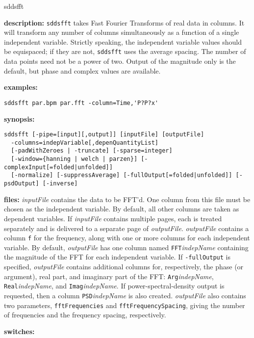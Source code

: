 \begin{sddsprog}{sddsfft}
  \item \textbf{description:} \verb|sddsfft| takes Fast Fourier Transforms of real data in columns. It will transform any number of columns simultaneously as a function of a single independent variable. Strictly speaking, the independent variable values should be equispaced; if they are not, \verb|sddsfft| uses the average spacing. The number of data points need not be a power of two. Output of the magnitude only is the default, but phase and complex values are available.
  \item \textbf{examples:}
    \begin{verbatim}
sddsfft par.bpm par.fft -column=Time,'P?P?x'
    \end{verbatim}
  \item \textbf{synopsis:}
    \begin{verbatim}
sddsfft [-pipe=[input][,output]] [inputFile] [outputFile]
  -columns=indepVariable[,depenQuantityList]
  [-padWithZeroes | -truncate] [-sparse=integer]
  [-window={hanning | welch | parzen}] [-complexInput[=folded|unfolded]]
  [-normalize] [-suppressAverage] [-fullOutput[=folded|unfolded]] [-psdOutput] [-inverse]
    \end{verbatim}
  \item \textbf{files:} \emph{inputFile} contains the data to be FFT'd. One column from this file must be chosen as the independent variable. By default, all other columns are taken as dependent variables. If \emph{inputFile} contains multiple pages, each is treated separately and is delivered to a separate page of \emph{outputFile}. \emph{outputFile} contains a column \verb|f| for the frequency, along with one or more columns for each independent variable. By default, \emph{outputFile} has one column named \verb|FFT|\emph{indepName} containing the magnitude of the FFT for each independent variable. If \verb|-fullOutput| is specified, \emph{outputFile} contains additional columns for, respectively, the phase (or argument), real part, and imaginary part of the FFT: \verb|Arg|\emph{indepName}, \verb|Real|\emph{indepName}, and \verb|Imag|\emph{indepName}. If power-spectral-density output is requested, then a column \verb|PSD|\emph{indepName} is also created. \emph{outputFile} also contains two parameters, \verb|fftFrequencies| and \verb|fftFrequencySpacing|, giving the number of frequencies and the frequency spacing, respectively.
  \item \textbf{switches:}
    \begin{itemize}

\end{itemize}
\end{sddsprog}
